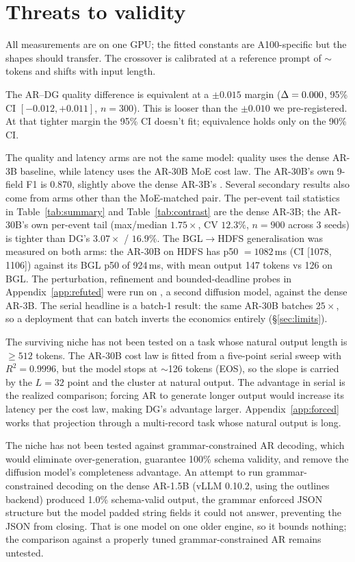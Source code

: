 \section{Threats to validity}
\label{sec:threats}

All measurements are on one GPU; the fitted constants are A100-specific
but the shapes should transfer. The crossover is calibrated at a
reference prompt of $\sim$\,tokens and shifts with input
length.

The AR--DG quality difference is equivalent at a $\pm 0.015$ margin
($\Delta = 0.000$, 95\% CI $[-0.012, +0.011]$, $n = 300$).
This is looser than the $\pm 0.010$ we pre-registered. At that
tighter margin the 95\% CI doesn't fit; equivalence holds only on
the 90\% CI.

The quality and latency arms are not the same model: quality uses the
dense AR-3B baseline, while latency uses the AR-30B MoE cost law.
The AR-30B's own 9-field F1 is 0.870, slightly above the dense
AR-3B's \arThreeBFnine. Several secondary results also come from arms
other than the MoE-matched pair. The per-event tail statistics in
Table~\ref{tab:summary} and Table~\ref{tab:contrast} are the dense
AR-3B; the AR-30B's own per-event tail (max/median $1.75\times$,
CV $12.3\%$, $n{=}900$ across 3 seeds) is tighter than DG's
$3.07\times$ / $16.9\%$. The BGL$\to$HDFS generalisation was
measured on both arms: the AR-30B on HDFS has p50 $= 1082$\,ms
(CI [1078, 1106]) against its BGL p50 of 924\,ms, with mean output
147 tokens vs 126 on BGL. The
perturbation, refinement and bounded-deadline probes in
Appendix~\ref{app:refuted} were run on \LLaDA, a second diffusion
model, against the dense AR-3B. The serial headline is a batch-1
result: the same AR-30B batches $25\times$, so a deployment that can
batch inverts the economics entirely (\S\ref{sec:limits}).

The surviving niche has not been tested on a task whose natural output
length is $\geq 512$ tokens. The AR-30B cost law is fitted from a
five-point serial sweep with $R^2 = 0.9996$, but the model stops at
$\sim$126 tokens (EOS), so the slope is carried by the $L{=}32$ point
and the cluster at natural output. The advantage in serial is the
realized comparison; forcing AR to generate longer output would
increase its latency per the cost law, making DG's advantage larger.
Appendix~\ref{app:forced} works that projection through a multi-record
task whose natural output is long.

The niche has not been tested against grammar-constrained AR decoding,
which would eliminate over-generation, guarantee 100\% schema
validity, and remove the diffusion model's completeness advantage. An
attempt to run grammar-constrained decoding on the dense AR-1.5B
(vLLM 0.10.2, using the outlines~\cite{outlines2024} backend) produced
1.0\% schema-valid output, the grammar enforced JSON structure but
the model padded string fields it could not answer, preventing the JSON
from closing. That is one model on one older engine, so it bounds
nothing; the comparison against a properly tuned grammar-constrained
AR remains untested.

